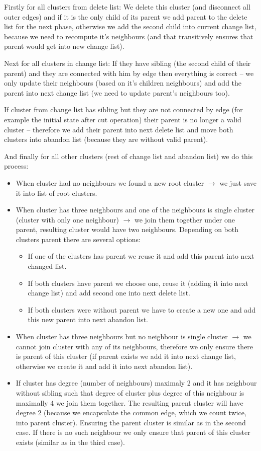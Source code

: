 Firstly for all clusters from delete list: We delete this cluster (and
disconnect all outer edges) and if it is the only child of its parent we add
parent to the delete list for the next phase, otherwise we add the second child
into current change list, because we need to recompute it's neighbours (and
that transitively ensures that parent would get into new change list).

Next for all clusters in change list: If they have sibling (the second child of
their parent) and they are connected with him by edge then everything is correct
-- we only update their neighbours (based on it's children neighbours) and add
the parent into next change list (we need to update parent's neighbours too).

If cluster from change list has sibling but they are not connected by edge (for
example the initial state after cut operation) their parent is no longer a
valid cluster -- therefore we add their parent into next delete list and move
both clusters into abandon list (because they are without valid parent).

And finally for all other clusters (rest of change list and abandon list) we do
this process:
\begin{itemize}
\item When cluster had no neighbours we found a new root cluster
$\rightarrow$ we just save it into list of root clusters.
\item When cluster has three neighbours and one of the neighbours is {\I single
cluster} (cluster with only one neighbour) $\rightarrow$ we join them together
under one parent, resulting cluster would have two neighbours. Depending on both
clusters parent there are several options:
	\begin{itemize}
	\item If one of the clusters has parent we reuse it and add this parent
	into next changed list.
	\item If both clusters have parent we choose one, reuse it (adding it
	into next change list) and add second one into next delete list.
	\item If both clusters were without parent we have to create a new one
	and add this new parent into next abandon list.
	\end{itemize}
\item When cluster has three neighbours but no neighbour is single cluster
$\rightarrow$ we cannot join cluster with any of its neighbours, therefore we
only ensure there is parent of this cluster (if parent exists we add it into
next change list, otherwise we create it and add it into next abandon list).
\item If cluster has degree (number of neighbours) maximaly 2 and it has
neighbour without sibling such that degree of cluster plus degree of this
neighbour is maximally 4 we join them together. The resulting parent cluster
will have degree 2 (because we encapsulate the common edge, which we count
twice, into parent cluster). Ensuring the parent cluster is similar as in the
second case. If there is no such neighbour we only ensure that parent of this cluster exists
(similar as in the third case).
\end{itemize}

